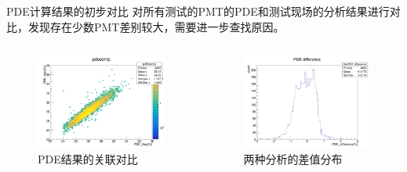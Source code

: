 \begin{frame}{PDE计算结果的初步对比}
对所有测试的PMT的PDE和测试现场的分析结果进行对比，发现存在少数PMT差别较大，需要进一步查找原因。
\begin{columns}
\begin{column}{.5\textwidth}
\begin{figure}
\centering
\includegraphics[width=\textwidth]{figures/pdecomparation.png} %
\caption{PDE结果的关联对比}
\end{figure}
\end{column}
\begin{column}{.5\textwidth}
\begin{figure}
\centering
\includegraphics[width=\textwidth]{figures/pdedifference.png} %
\caption{两种分析的差值分布}
\end{figure}
\end{column}
\end{columns}
\end{frame}
